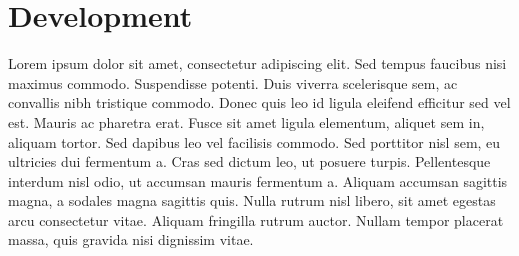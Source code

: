 
\section{Development}

Lorem ipsum dolor sit amet, consectetur adipiscing elit. Sed tempus faucibus nisi maximus commodo. Suspendisse potenti. Duis viverra scelerisque sem, ac convallis nibh tristique commodo. Donec quis leo id ligula eleifend efficitur sed vel est. Mauris ac pharetra erat. Fusce sit amet ligula elementum, aliquet sem in, aliquam tortor. Sed dapibus leo vel facilisis commodo. Sed porttitor nisl sem, eu ultricies dui fermentum a. Cras sed dictum leo, ut posuere turpis. Pellentesque interdum nisl odio, ut accumsan mauris fermentum a. Aliquam accumsan sagittis magna, a sodales magna sagittis quis. Nulla rutrum nisl libero, sit amet egestas arcu consectetur vitae. Aliquam fringilla rutrum auctor. Nullam tempor placerat massa, quis gravida nisi dignissim vitae. 